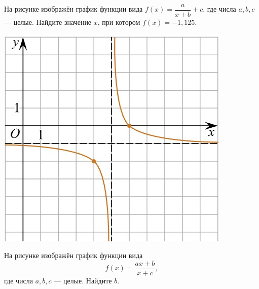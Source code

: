 \begin{class}[number=6]
\begin{listofex}
\begin{minipage}[c]{0.1\textwidth}
		\end{minipage}
		\item
		\begin{minipage}[t]{0.43\textwidth}
			На рисунке изображён график функции вида \(f(x)=\dfrac{a}{x+b}+c\), где числа \(a, b, c\) --- целые. Найдите значение \(x\), при котором \(f(x)=-1,125\).
		\end{minipage}
		\begin{minipage}[c]{0.1\textwidth}
			\includegraphics[align=t, width=\textwidth]{../pics/G101M4C6-4.jpg}
		\end{minipage}
		\item
		\begin{minipage}[t]{\bodywidth}
			На рисунке изображён график функции вида \[ f(x)=\dfrac{ax+b}{x+c}, \] где числа \(a, b, c\) --- целые. Найдите \(b\).
		\end{minipage}
		\hspace{0.02\linewidth}
		\begin{minipage}[t]{\picwidth}

\end{minipage}
\end{listofex}
\end{class}
